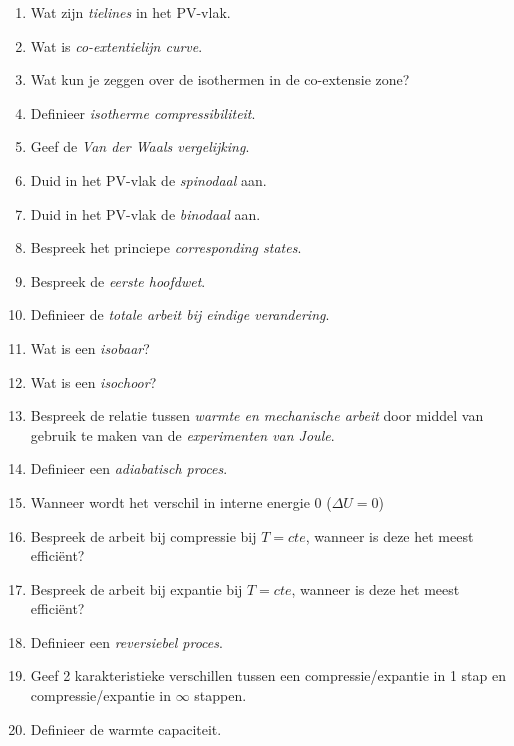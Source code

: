 \documentclass[12pt]{article}
\begin{document}
\begin{enumerate}
		\item Wat zijn \emph{tielines} in het PV-vlak.
		\item Wat is \emph{co-extentielijn curve}.
		\item Wat kun je zeggen over de isothermen in de co-extensie zone?
		\item Definieer \emph{isotherme compressibiliteit}.
		\item Geef de \emph{Van der Waals vergelijking}.
		\item Duid in het PV-vlak de \emph{spinodaal} aan.
		\item Duid in het PV-vlak de \emph{binodaal} aan.
		\item Bespreek het princiepe \emph{corresponding states}.
		\item Bespreek de \emph{eerste hoofdwet}.
		\item Definieer de \emph{totale arbeit bij eindige verandering}.
		\item Wat is een \emph{isobaar}?
		\item Wat is een \emph{isochoor}?
		\item Bespreek de relatie tussen \emph{warmte en mechanische arbeit} door middel van gebruik te maken van de \emph{experimenten van Joule}.
		\item Definieer een \emph{adiabatisch proces}.
		\item Wanneer wordt het verschil in interne energie 0 ($\Delta U = 0 $)
		\item Bespreek de arbeit bij compressie bij  $T=cte$, wanneer is deze het meest effici\"ent?
		\item Bespreek de arbeit bij expantie bij  $T=cte$, wanneer is deze het meest effici\"ent?
		\item Definieer een \emph{reversiebel proces}.
		\item Geef 2 karakteristieke verschillen tussen een compressie/expantie in 1 stap en compressie/expantie in  $\infty$ stappen.
		\item Definieer de warmte capaciteit.
	\end{enumerate}
\end{document}
